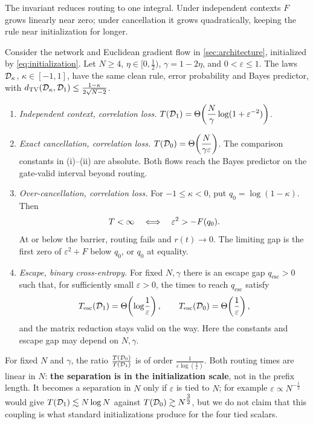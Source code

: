 The invariant reduces routing to one integral. Under independent contexts $F$ grows linearly near zero;
under cancellation it grows quadratically, keeping the rule near initialization for longer.

\begin{mainresult}
\begin{theorem}
\label{thm:separation}
Consider the network and Euclidean gradient flow in \cref{sec:architecture}, initialized by \cref{eq:initialization}.
Let $N\ge4$, $\eta\in[0,\tfrac{1}{2})$, $\gamma=1-2\eta$, and $0<\varepsilon\le1$.
The laws $\mathcal D_{\kappa}$, $\kappa\in[-1,1]$, have the same clean rule, error probability and Bayes predictor,
with $d_{\mathrm{TV}}(\mathcal D_{\kappa},\mathcal D_{1})\le\tfrac{1-\kappa}{2\sqrt{N-2}}$.
\begin{enumerate}[label=(\roman*),leftmargin=*,itemsep=2pt,topsep=2pt]
\item \emph{Independent context, correlation loss.}
$\displaystyle T(\mathcal D_{1})=\Theta\!\left(\frac{N}{\gamma}\log(1+\varepsilon^{-2})\right)$.
\item \emph{Exact cancellation, correlation loss.}
$\displaystyle T(\mathcal D_{0})=\Theta\!\left(\frac{N}{\gamma \varepsilon}\right)$.
The comparison constants in (i)--(ii) are absolute. Both flows reach the Bayes predictor on the gate-valid interval beyond routing.
\item \emph{Over-cancellation, correlation loss.}
For $-1\le \kappa<0$, put $q_0=\log(1-\kappa)$. Then
\[
 T<\infty\quad\Longleftrightarrow\quad \varepsilon^2>-F(q_0).
\]
At or below the barrier, routing fails and $r(t)\to0$.
The limiting gap is the first zero of $\varepsilon^2+F$ below $q_0$, or $q_0$ at equality.
\item \emph{Escape, binary cross-entropy.}
For fixed $N,\gamma$ there is an escape gap $q_{\mathrm{esc}}>0$ such that, for sufficiently small $\varepsilon>0$,
the times to reach $q_{\mathrm{esc}}$ satisfy
\[
 T_{\mathrm{esc}}(\mathcal D_{1})=\Theta\!\left(\log\!\frac{1}{\varepsilon}\right),\qquad
 T_{\mathrm{esc}}(\mathcal D_{0})=\Theta\!\left(\frac{1}{\varepsilon}\right),
\]
and the matrix reduction stays valid on the way.
Here the constants and escape gap may depend on $N,\gamma$.
\end{enumerate}
\end{theorem}
\end{mainresult}

For fixed $N$ and $\gamma$, the ratio $\tfrac{T(\mathcal D_{0})}{T(\mathcal D_{1})}$ is of order $\tfrac{1}{\varepsilon\log(\tfrac{1}{\varepsilon})}$. Both routing times are
linear in $N$: \textbf{the separation is in the initialization scale}, not in the prefix length. It becomes a separation in $N$ only if $\varepsilon$ is tied to $N$;
for example $\varepsilon\propto N^{-\tfrac{1}{2}}$ would give $T(\mathcal D_{1})\lesssim N\log N$ against $T(\mathcal D_{0})\gtrsim N^{\tfrac{3}{2}}$, but we do not claim that this coupling
is what standard initializations produce for the four tied scalars.

